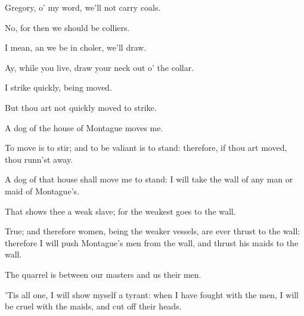  
\begin{speech}
Gregory, o' my word, we'll not
carry coals.
\end{speech}
\begin{speech}
No, for then we should be colliers.
\end{speech}
\begin{speech}
I mean, an we be in choler, we'll
draw.
\end{speech}
\begin{speech}
Ay, while you live, draw your neck
out o' the collar.
\end{speech}
\begin{speech}
I strike quickly, being moved.
\end{speech}
\begin{speech}
But thou art not quickly moved to
strike.
\end{speech}
\begin{speech}
A dog of the house of Montague moves me.
\end{speech}
\begin{speech}
To move is to stir; and to be valiant
is to stand: therefore, if thou art moved, thou
runn'st away.
\end{speech}
\begin{speech}
A dog of that house shall move me
to stand: I will take the wall of any man or
maid of Montague's.
\end{speech}
\begin{speech}
That shows thee a weak slave; for
the weakest goes to the wall.
\end{speech}
\begin{speech}
True; and therefore women, being
the weaker vessels, are ever thrust to the wall:
therefore I will push Montague's men from
the wall, and thrust his maids to the wall.
\end{speech}
\begin{speech}
The quarrel is between our masters
and us their men.
\end{speech}
\begin{speech}
'Tis all one, I will show myself a
tyrant: when I have fought with the men, I
will be cruel with the maids, and cut off their
heads.
\end{speech}
